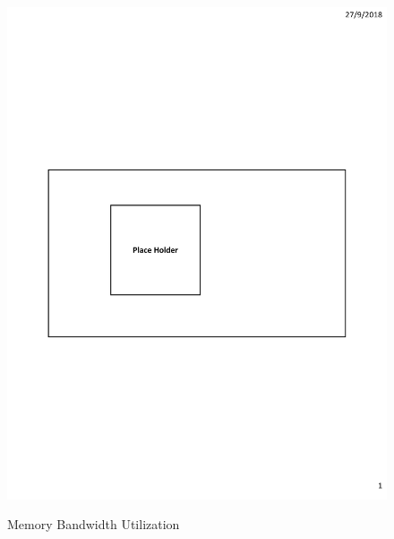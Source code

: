 \begin{figure}[h]
\begin{minipage}{0.3\linewidth}
	\includegraphics[width=\linewidth]{fig/PlaceHolder.pdf}
	\centerline{Memory Bandwidth Utilization}
	\end{minipage}
	\hfill
	\begin{minipage}{0.3\linewidth}\centering

\end{minipage}
\end{figure}
